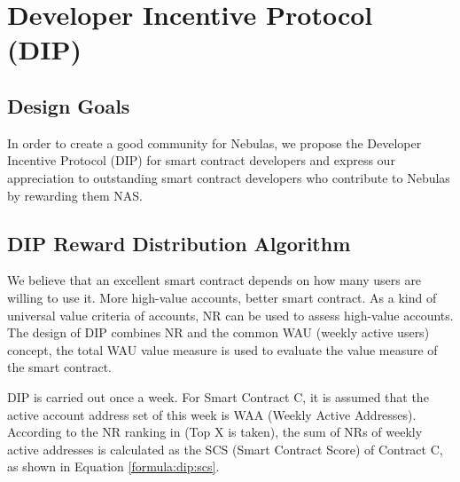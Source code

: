 \section{Developer Incentive Protocol (DIP)}
\label{sec:dip}

\subsection{Design Goals}
\label{dip:design}

In order to create a good community for Nebulas, we propose the Developer Incentive Protocol (DIP) for smart contract developers and express our appreciation to outstanding smart contract developers who contribute to Nebulas by rewarding them NAS. 


\subsection{DIP Reward Distribution Algorithm}
\label{dip:arith}

We believe that an excellent smart contract depends on how many users are willing to use it. More high-value accounts, better smart contract. As a kind of universal value criteria of accounts, NR can be used to assess high-value accounts. The design of DIP combines NR and the common WAU (weekly active users) concept, the total WAU value measure is used to evaluate the value measure of the smart contract.


DIP is carried out once a week. For Smart Contract C, it is assumed that the active account address set of this week is WAA (Weekly Active Addresses). According to the NR ranking in  (Top X is taken), the sum of NRs of weekly active addresses is calculated as the SCS (Smart Contract Score) of Contract C, as shown in Equation \ref{formula:dip:scs}. 


